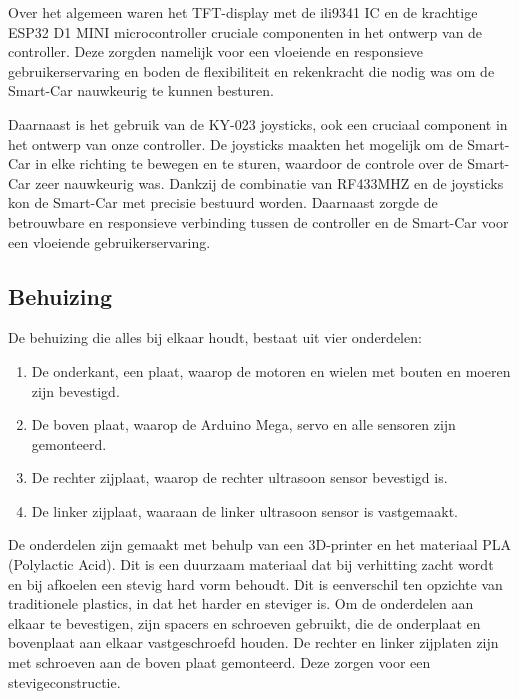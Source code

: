 Over het algemeen waren het \gls{TFT-display} met de \gls{ili9341}\cite{ILI3941} IC en de krachtige ESP32\cite{ESP32} D1 MINI \gls{microcontroller} cruciale componenten in het ontwerp van de controller. Deze zorgden namelijk voor een vloeiende en responsieve gebruikerservaring en boden de flexibiliteit en rekenkracht die nodig was om de \gls{Smart-Car} nauwkeurig te kunnen besturen.

Daarnaast is het gebruik van de KY-023\cite{KY023} joysticks, ook een cruciaal component in het ontwerp van onze controller. De joysticks maakten het mogelijk om de \gls{Smart-Car} in elke richting te bewegen en te sturen, waardoor de controle over de \gls{Smart-Car} zeer nauwkeurig was. Dankzij de combinatie van \gls{RF433MHZ} en de joysticks kon de \gls{Smart-Car} met precisie bestuurd worden. Daarnaast zorgde de betrouwbare en responsieve verbinding tussen de controller en de \gls{Smart-Car} voor een vloeiende gebruikerservaring.

\subsection{Behuizing}
De behuizing die alles bij elkaar houdt, bestaat uit vier onderdelen:
\begin{enumerate}
\item De onderkant, een plaat, waarop de motoren en wielen met bouten en moeren zijn bevestigd.\item De boven plaat, waarop de Arduino Mega, servo en alle sensoren zijn gemonteerd.
\item De rechter zijplaat, waarop de rechter ultrasoon sensor bevestigd is.
\item De linker zijplaat, waaraan de linker ultrasoon sensor is vastgemaakt.
\end{enumerate}
De onderdelen zijn gemaakt met behulp van een 3D-printer en het materiaal PLA (Polylactic Acid). Dit is een duurzaam materiaal dat bij verhitting zacht wordt en bij afkoelen een stevig hard vorm behoudt. Dit is eenverschil ten opzichte van traditionele plastics, in dat het harder en steviger is. Om de onderdelen aan elkaar te bevestigen, zijn spacers en schroeven gebruikt, die de onderplaat en bovenplaat aan elkaar vastgeschroefd houden. De rechter en linker zijplaten zijn met schroeven aan de boven plaat gemonteerd. Deze zorgen voor een stevigeconstructie.
